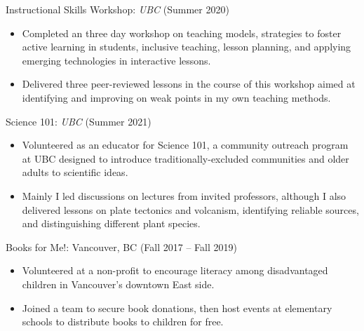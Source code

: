 \documentclass[10pt]{res} %
\begin{document}
\begin{resume}
{Instructional Skills Workshop: \sl UBC} \hfill (Summer 2020) \\
\begin{itemize} \itemsep -2pt %
	\item Completed an three day workshop on teaching models, strategies to foster active learning in students, inclusive teaching, lesson planning, and applying emerging technologies in interactive lessons.
	\item Delivered three peer-reviewed lessons in the course of this workshop aimed at identifying and improving on weak points in my own teaching methods.
\end{itemize}


{Science 101: \sl UBC} \hfill (Summer 2021) \\
\begin{itemize} \itemsep -2pt %
	\item Volunteered as an educator for Science 101, a community outreach program at UBC designed to introduce traditionally-excluded communities and older adults to scientific ideas.
	\item Mainly I led discussions on lectures from invited professors, although I also delivered lessons on plate tectonics and volcanism, identifying reliable sources, and distinguishing different plant species. 
\end{itemize}

{Books for Me!: Vancouver, BC} \hfill (Fall 2017 -- Fall 2019) \\
\begin{itemize} \itemsep -2pt %
	\item Volunteered at a non-profit to encourage literacy among disadvantaged children in Vancouver's downtown East side.
	\item Joined a team to secure book donations, then host events at elementary schools to distribute books to children for free.
\end{itemize}


\vspace{0.2in} %




\end{resume} 
\end{document}
